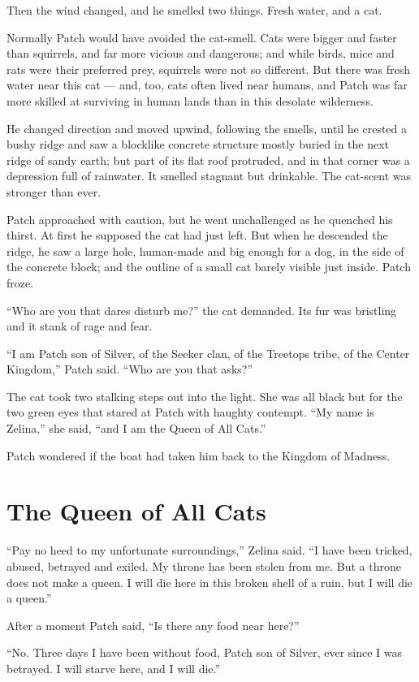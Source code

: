 \documentclass[ebook,oneside,openany,17pt]{memoir}
\renewcommand{\thechapter}{\Roman{chapter}}
\newcounter{sections}
\newcommand{\sections}[1]{%
  \section*{#1}
  \addtocounter{sections}{1}%
  \pdfbookmark[1]{#1}{section.\thechapter.\thesections}}
\begin{document}
Then the wind changed, and he smelled two things. Fresh water, and a
cat.

Normally Patch would have avoided the cat-smell. Cats were bigger and
faster than squirrels, and far more vicious and dangerous; and while
birds, mice and rats were their preferred prey, squirrels were not so
different. But there was fresh water near this cat — and, too, cats
often lived near humans, and Patch was far more skilled at surviving
in human lands than in this desolate wilderness.

He changed direction and moved upwind, following the smells, until he
crested a bushy ridge and saw a blocklike concrete structure mostly
buried in the next ridge of sandy earth; but part of its flat roof
protruded, and in that corner was a depression full of rainwater. It
smelled stagnant but drinkable. The cat-scent was stronger than ever.

Patch approached with caution, but he went unchallenged as he quenched
his thirst. At first he supposed the cat had just left. But when he
descended the ridge, he saw a large hole, human-made and big enough
for a dog, in the side of the concrete block; and the outline of a
small cat barely visible just inside. Patch froze.

“Who are you that dares disturb me?” the cat demanded. Its fur was
bristling and it stank of rage and fear.

“I am Patch son of Silver, of the Seeker clan, of the Treetops tribe,
of the Center Kingdom,” Patch said. “Who are you that asks?”

The cat took two stalking steps out into the light. She was all black
but for the two green eyes that stared at Patch with haughty
contempt. “My name is Zelina,” she said, “and I am the Queen of All
Cats.”

Patch wondered if the boat had taken him back to the Kingdom of
Madness.


\sections{The Queen of All Cats}

“Pay no heed to my unfortunate surroundings,” Zelina said. “I have
been tricked, abused, betrayed and exiled. My throne has been stolen
from me. But a throne does not make a queen. I will die here in this
broken shell of a ruin, but I will die a queen.”

After a moment Patch said, “Is there any food near here?”

“No. Three days I have been without food, Patch son of Silver, ever
since I was betrayed. I will starve here, and I will die.”
\end{document}
